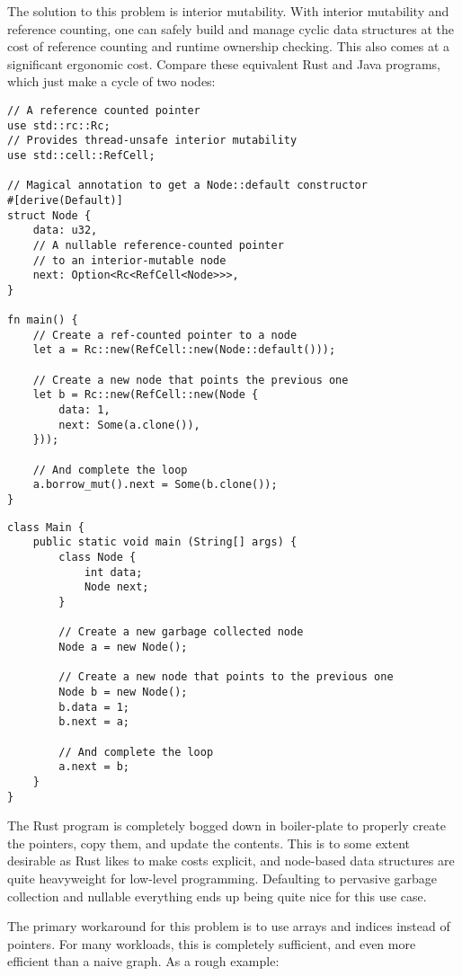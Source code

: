 The solution to this problem is interior mutability. With interior mutability
and reference counting, one can safely build and manage cyclic data structures
at the cost of reference counting and runtime ownership checking. This also
comes at a significant ergonomic cost. Compare these equivalent Rust and
Java programs, which just make a cycle of two nodes:

\begin{verbatim}
// A reference counted pointer
use std::rc::Rc;
// Provides thread-unsafe interior mutability
use std::cell::RefCell;

// Magical annotation to get a Node::default constructor
#[derive(Default)]
struct Node {
    data: u32,
    // A nullable reference-counted pointer
    // to an interior-mutable node
    next: Option<Rc<RefCell<Node>>>,
}

fn main() {
    // Create a ref-counted pointer to a node
    let a = Rc::new(RefCell::new(Node::default()));

    // Create a new node that points the previous one
    let b = Rc::new(RefCell::new(Node {
        data: 1,
        next: Some(a.clone()),
    }));

    // And complete the loop
    a.borrow_mut().next = Some(b.clone());
}
\end{verbatim}

\begin{verbatim}
class Main {
    public static void main (String[] args) {
        class Node {
            int data;
            Node next;
        }

        // Create a new garbage collected node
        Node a = new Node();

        // Create a new node that points to the previous one
        Node b = new Node();
        b.data = 1;
        b.next = a;

        // And complete the loop
        a.next = b;
    }
}
\end{verbatim}

The Rust program is completely bogged down in boiler-plate to properly create
the pointers, copy them, and update the contents. This is to some extent desirable
as Rust likes to make costs explicit, and node-based data structures are quite
heavyweight for low-level programming. Defaulting to pervasive garbage collection
and nullable everything ends up being quite nice for this use case.

The primary workaround for this problem is to use arrays and indices instead of
pointers. For many workloads, this is completely sufficient, and even more
efficient than a naive graph. As a rough example:

